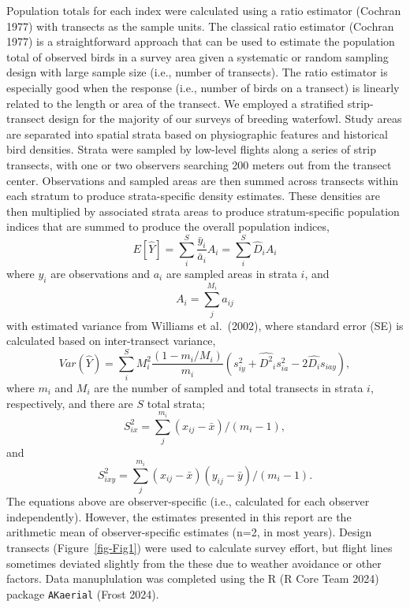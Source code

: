 \documentclass[
]{article}
\begin{document}
Population totals for each index were calculated using a ratio estimator
(Cochran 1977) with transects as the sample units. The classical ratio
estimator (Cochran 1977) is a straightforward approach that can be used
to estimate the population total of observed birds in a survey area
given a systematic or random sampling design with large sample size
(i.e., number of transects). The ratio estimator is especially good when
the response (i.e., number of birds on a transect) is linearly related
to the length or area of the transect. We employed a stratified
strip-transect design for the majority of our surveys of breeding
waterfowl. Study areas are separated into spatial strata based on
physiographic features and historical bird densities. Strata were
sampled by low-level flights along a series of strip transects, with one
or two observers searching 200 meters out from the transect center.
Observations and sampled areas are then summed across transects within
each stratum to produce strata-specific density estimates. These
densities are then multiplied by associated strata areas to produce
stratum-specific population indices that are summed to produce the
overall population indices,
\[E[\hat Y] = \displaystyle\sum_{i}^{S} \frac{\bar y_i}{\bar a_i} A_i = \displaystyle\sum_{i}^{S} \hat D_i A_i\]
where \(y_i\) are observations and \(a_i\) are sampled areas in strata
\(i\), and \[A_i = \displaystyle\sum_{j}^{M_i} a_{ij}\] with estimated
variance from Williams et al.~(2002), where standard error (SE) is
calculated based on inter-transect variance,~
\[Var(\hat Y) = \displaystyle\sum_{i}^{S} M_i^2 \frac{(1-m_i / M_i)}{m_i} ( s^2_{iy} + \hat {D^2}_i s^2_{ia} - 2 \hat {D_i} s_{iay} ),\]
where \(m_i\) and \(M_i\) are the number of sampled and total transects
in strata \(i\), respectively, and there are \(S\) total strata;~
\[S^2_{ix} = \displaystyle\sum_{j}^{m_i} (x_{ij} - \bar x )/(m_i -1), \]
and~
\[S^2_{ixy} = \displaystyle\sum_{j}^{m_i} (x_{ij} - \bar x )(y_{ij} - \bar y )/(m_i -1).\]
The equations above are observer-specific (i.e., calculated for each
observer independently). However, the estimates presented in this report
are the arithmetic mean of observer-specific estimates (n=2, in most
years). Design transects (Figure~\ref{fig-Fig1}) were used to calculate
survey effort, but flight lines sometimes deviated slightly from the
these due to weather avoidance or other factors. Data manuplulation was
completed using the R (R Core Team 2024) package \texttt{AKaerial}
(Frost 2024).
\end{document}

